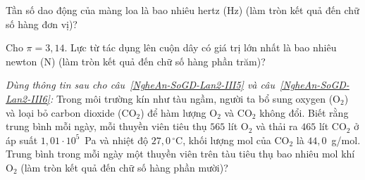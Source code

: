 \begin{ex}
\begin{center}
		\end{center}
		Tần số dao động của màng loa là bao nhiêu hertz (Hz) (làm tròn kết quả đến chữ số hàng đơn vị)?
		\par
	\end{ex}

	\begin{ex}%
		\label{NgheAn-SoGD-Lan2-III4}
		Cho $\pi=3{,}14$. Lực từ tác dụng lên cuộn dây có giá trị lớn nhất là bao nhiêu newton (N) (làm tròn kết quả đến chữ số hàng phần trăm)?
		\par
	\end{ex}

	\begin{ex}%
		\label{NgheAn-SoGD-Lan2-III5}
		\textit{Dùng thông tin sau cho câu~\ref{NgheAn-SoGD-Lan2-III5} và câu~\ref{NgheAn-SoGD-Lan2-III6}:} Trong môi trường kín như tàu ngầm, người ta bổ sung oxygen ($\text{O}_2$) và loại bỏ carbon dioxide ($\text{CO}_2$) để hàm lượng $\text{O}_2$ và $\text{CO}_2$ không đổi. Biết rằng trung bình mỗi ngày, mỗi thuyền viên tiêu thụ $565$ lít $\text{O}_2$ và thải ra $465$ lít $\text{CO}_2$ ở áp suất $1{,}01\cdot 10^5$~Pa và nhiệt độ $27{,}0\,^\circ\text{C}$, khối lượng mol của $\text{CO}_2$ là $44{,}0$~g/mol.\\
		Trung bình trong mỗi ngày một thuyền viên trên tàu tiêu thụ bao nhiêu mol khí $\text{O}_2$ (làm tròn kết quả đến chữ số hàng phần mười)?
		\par
	\end{ex}

